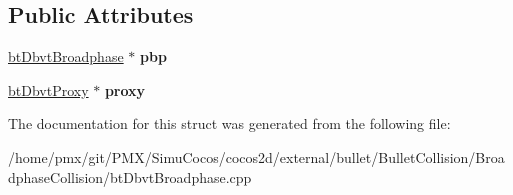\subsection*{Public Attributes}
\begin{DoxyCompactItemize}
\item 
\mbox{\label{structbtDbvtTreeCollider_aefa049f8cf4f7262326ccb4c3453d418}} 
\hyperlink{structbtDbvtBroadphase}{bt\+Dbvt\+Broadphase} $\ast$ {\bfseries pbp}
\item 
\mbox{\label{structbtDbvtTreeCollider_a47419bc25f3788bde22e5341dce83688}} 
\hyperlink{structbtDbvtProxy}{bt\+Dbvt\+Proxy} $\ast$ {\bfseries proxy}
\end{DoxyCompactItemize}


The documentation for this struct was generated from the following file\+:\begin{DoxyCompactItemize}
\item 
/home/pmx/git/\+P\+M\+X/\+Simu\+Cocos/cocos2d/external/bullet/\+Bullet\+Collision/\+Broadphase\+Collision/bt\+Dbvt\+Broadphase.\+cpp\end{DoxyCompactItemize}
